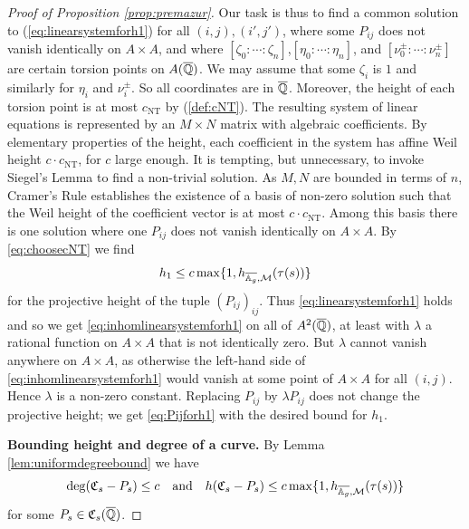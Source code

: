 \begin{proof}[Proof of Proposition \ref{prop:premazur}]
  Our task is thus to find a  common solution to
  (\ref{eq:linearsystemforh1}) for all $(i,j),(i',j')$, where some
  $P_{ij}$ does not vanish identically on $A\times A$, and where 
  $[\zeta_0:\cdots:\zeta_n]$,$[\eta_0:\cdots:\eta_n]$, and
  $[\nu^{\pm}_0:\cdots :\nu^{\pm}_n]$ are certain torsion points on
  $A({\overline{\mathbb{Q}}})$. We may assume that some $\zeta_i$ is $1$ and similarly
  for  $\eta_i$ and
  $\nu^{\pm}_i$. So all coordinates are in ${\overline{\mathbb{Q}}}$. Moreover, the
  height  of each torsion point is at most $c_{\mathrm{NT}}$ by (\ref{def:cNT}).
  The resulting system of linear equations is represented by an
  $M\times N$ matrix with algebraic coefficients. By elementary
  properties of the height, each coefficient in the system has affine
  Weil height $c \cdot c_{\mathrm{NT}}$, for $c$ large enough. It is tempting, but
  unnecessary, to invoke Siegel's Lemma to find a non-trivial solution.
  As $M,N$ are bounded in terms of $n$, 
  Cramer's Rule establishes the existence of a basis of 
  non-zero solution such that the Weil height of the coefficient
  vector is at most $c \cdot c_{\mathrm{NT}}$.
  Among this basis there
  is one solution where one $P_{ij}$ does not vanish identically on
  $A\times A$. By \eqref{eq:choosecNT} we find
  \begin{equation}
    \label{eq:h1bound}
    h_1 \le     c\max\{1,h_{\overline{\mathbb{A}_g},{\mathcal M}}(\tau(s))\}
  \end{equation}
  for the projective height of the tuple $(P_{ij})_{ij}$. 
  Thus \eqref{eq:linearsystemforh1} holds and so we get
  \eqref{eq:inhomlinearsystemforh1} on all of $A^2({\overline{\mathbb{Q}}})$, at least with  $\lambda$ a rational
  function on $A\times A$ that is not identically zero. But $\lambda$ cannot
  vanish anywhere on $A\times A$, as otherwise the left-hand side of
  \eqref{eq:inhomlinearsystemforh1} would vanish at some point of
  $A\times A$ for all $(i,j)$. Hence $\lambda$ is a non-zero constant. Replacing
  $P_{ij}$ by $\lambda P_{ij}$ does not change the projective height;
  we get \eqref{eq:Pijforh1} with the desired bound for $h_1$. 

  \medskip
  \textbf{Bounding height and degree of a curve.} 
  By Lemma \ref{lem:uniformdegreebound} we have
  \begin{equation}
    \label{eq:degreehgtbound}
    \deg(\mathfrak{C}_s-P_s)\le c\quad\text{and}\quad 
    h(\mathfrak{C}_s-P_s)\le
    c \max\{1,h_{\overline{\mathbb{A}_g},{\mathcal M}}(\tau(s))\}
  \end{equation}
  for some
  $P_s\in \mathfrak{C}_s({\overline{\mathbb{Q}}})$.


\end{proof}
